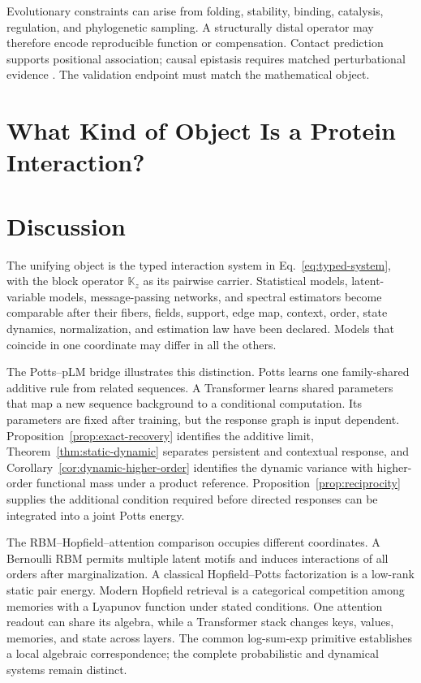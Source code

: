\documentclass[10pt]{article}
\theoremstyle{definition}
\theoremstyle{remark}
\newcommand{\BookChapter}[1]{\section{#1}}
\newcommand{\BookInsert}[1]{}
\newcommand{\BookChapterLabel}[1]{}
\begin{document}
Evolutionary constraints can arise from folding, stability, binding, catalysis, regulation, and
phylogenetic sampling.  A structurally distal operator may therefore encode reproducible function
or compensation.  Contact prediction supports positional association; causal epistasis requires
matched perturbational evidence \cite{starr2016,starr2017}.  The validation endpoint must match the
mathematical object.

\BookInsert{chapters/11_coda}
\ifdefined\BOOKMODE
\BookChapter{What Kind of Object Is a Protein Interaction?}
\BookChapterLabel{chap:book-epilogue}
\BookInsert{chapters/12_epilogue}
\else
\BookChapter{Discussion}

The unifying object is the typed interaction system in Eq.~\ref{eq:typed-system}, with the block
operator $\mathbb K_z$ as its
pairwise carrier.  Statistical models, latent-variable models, message-passing networks, and
spectral estimators become comparable after their fibers, fields, support, edge map, context,
order, state dynamics, normalization, and estimation law have been declared.  Models that
coincide in one coordinate may differ in all the others.

The Potts--pLM bridge illustrates this distinction.  Potts learns one family-shared additive rule
from related sequences.  A Transformer learns shared parameters that map a new sequence background
to a conditional computation.  Its parameters are fixed after training, but the response graph is
input dependent.  Proposition~\ref{prop:exact-recovery} identifies the additive limit,
Theorem~\ref{thm:static-dynamic} separates persistent and contextual response, and
Corollary~\ref{cor:dynamic-higher-order} identifies the dynamic variance with higher-order
functional mass under a product reference.  Proposition~\ref{prop:reciprocity} supplies the
additional condition required before directed responses can be integrated into a joint Potts
energy.

The RBM--Hopfield--attention comparison occupies different coordinates.  A Bernoulli RBM permits
multiple latent motifs and induces interactions of all orders after marginalization.  A classical
Hopfield--Potts factorization is a low-rank static pair energy.  Modern Hopfield retrieval is a
categorical competition among memories with a Lyapunov function under stated conditions.  One
attention readout can share its algebra, while a Transformer stack changes keys, values, memories,
and state across layers.  The common log-sum-exp primitive establishes a local algebraic
correspondence; the complete probabilistic and dynamical systems remain distinct.
\end{document}
